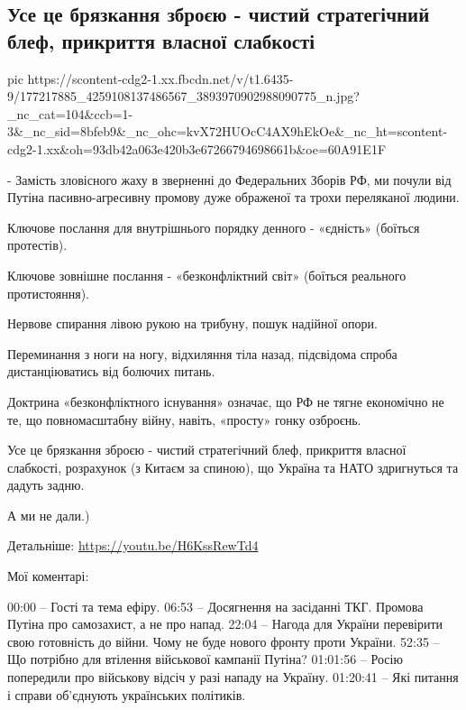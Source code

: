  
 
 
 
 
\subsection{Усе це брязкання зброєю - чистий стратегічний блеф, прикриття власної слабкості}

\ifcmt
  pic https://scontent-cdg2-1.xx.fbcdn.net/v/t1.6435-9/177217885_4259108137486567_3893970902988090775_n.jpg?_nc_cat=104&ccb=1-3&_nc_sid=8bfeb9&_nc_ohc=kvX72HUOcC4AX9hEkOe&_nc_ht=scontent-cdg2-1.xx&oh=93db42a063e420b3e67266794698661b&oe=60A91E1F
\fi

- Замість зловісного жаху в зверненні до Федеральних Зборів РФ, ми почули від
Путіна пасивно-агресивну промову дуже ображеної та трохи переляканої людини.

Ключове послання для внутрішнього порядку денного - «єдність» (боїться протестів).

Ключове зовнішне послання - «безконфліктний світ» (боїться реального протистояння). 

Нервове спирання лівою рукою на трибуну, пошук надійної опори.

Переминання з ноги на ногу, відхиляння тіла назад, підсвідома спроба дистанціюватись від болючих питань.

Доктрина «безконфліктного існування» означає, що РФ не тягне економічно не те,
що повномасштабну війну, навіть, «просту» гонку озброєнь.

Усе це брязкання зброєю - чистий стратегічний блеф, прикриття власної
слабкості, розрахунок (з Китаєм за спиною), що Україна та НАТО здригнуться та
дадуть задню.

А ми не дали.)

Детальніше: \url{https://youtu.be/H6KssRewTd4}

Мої коментарі: 

00:00 – Гості та тема ефіру.
06:53 – Досягнення на засіданні ТКГ. Промова Путіна про самозахист, а не про напад. 
22:04 – Нагода для України перевірити свою готовність до війни. Чому не буде нового фронту проти України.
52:35 – Що потрібно для втілення військової кампанії Путіна?
01:01:56 – Росію попередили про військову відсіч у разі нападу на Україну.
01:20:41 – Які питання і справи об’єднують українських політиків.

